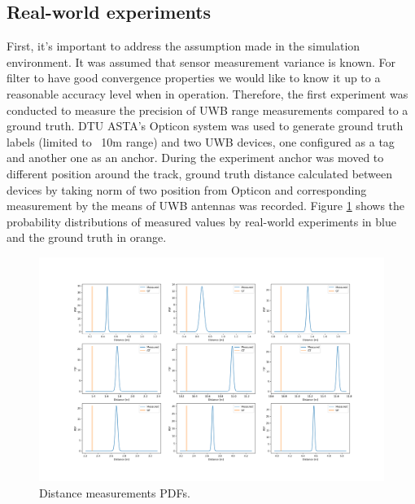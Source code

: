 \subsection{Real-world experiments}

First, it's important to address the assumption made in the simulation environment. It was assumed that sensor measurement variance is known. For filter to have good convergence properties we would like to know it up to a reasonable accuracy level when in operation. Therefore, the first experiment was conducted to measure the precision of UWB range measurements compared to a ground truth. DTU ASTA's Opticon system was used to generate ground truth labels (limited to ~10m range) and two UWB devices, one configured as a tag and another one as an anchor. During the experiment anchor was moved to different position around the track, ground truth distance calculated between devices by taking norm of two position from Opticon and corresponding measurement by the means of UWB antennas was recorded. Figure \ref{fig:distancePDF} shows the probability distributions of measured values by real-world experiments in blue and the ground truth in orange.
\begin{figure}
    \includegraphics[width=\linewidth]{figures/distancePDF.png}
    \caption{Distance measurements PDFs.}
    \label{fig:distancePDF}
\end{figure}

